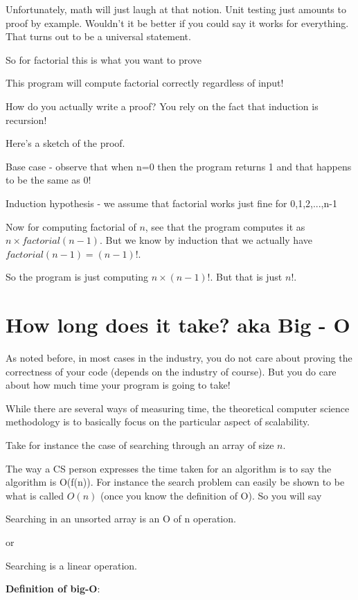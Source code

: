 \documentclass[12pt]{article}
\begin{document}
Unfortunately, math will just laugh at that notion. Unit testing just amounts to proof by example. Wouldn't it be better if you could say it works for everything. That turns out to be a universal statement.

\medskip

So for factorial this is what you want to prove

This program will compute factorial correctly regardless of input! 

How do you actually write a proof? You rely on the fact that induction is recursion!

Here's a sketch of the proof.

Base case - observe that when n=0 then the program returns 1 and that happens to be the same as 0!

Induction hypothesis - we assume that factorial works just fine for 0,1,2,...,n-1

Now for computing factorial of $n$, see that the program computes it as $n \times factorial(n-1)$. But we know by induction that we actually have $factorial(n-1) = (n-1)!$.

So the program is just computing $n \times (n-1)!$. But that is just $n!$.

\section*{How long does it take? aka Big - O}

As noted before, in most cases in the industry, you do not care about proving the correctness of your code (depends on the industry of course). But you do care about how much time your program is going to take!

While there are several ways of measuring time, the theoretical computer science methodology is to basically focus on the particular aspect of scalability. 

Take for instance the case of searching through an array of size $n$.

The way a CS person expresses the time taken for an algorithm is to say the algorithm is O(f(n)). For instance the search problem can easily be shown to be what is called $O(n)$ (once you know the definition of O). So you will say 

Searching in an unsorted array is an O of n operation. 

or 

Searching is a linear operation.

\textbf{Definition of big-O}: 
\end{document}
